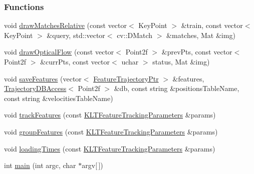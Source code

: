 \subsubsection*{Functions}
\begin{DoxyCompactItemize}
\item 
void \hyperlink{feature-based-tracking_8cpp_abdd9682450101445b0143ce9ebe15e69}{draw\-Matches\-Relative} (const vector$<$ Key\-Point $>$ \&train, const vector$<$ Key\-Point $>$ \&query, std\-::vector$<$ cv\-::\-D\-Match $>$ \&matches, Mat \&img)
\item 
void \hyperlink{feature-based-tracking_8cpp_aa072ce4b1977dc4227d2ab59cec93b5f}{draw\-Optical\-Flow} (const vector$<$ Point2f $>$ \&prev\-Pts, const vector$<$ Point2f $>$ \&curr\-Pts, const vector$<$ uchar $>$ status, Mat \&img)
\item 
void \hyperlink{feature-based-tracking_8cpp_a6812bb18e9569715c73f6ee0f25cad0a}{save\-Features} (vector$<$ \hyperlink{Motion_8hpp_a86ae4681c45e5385d5543cff332f56f4}{Feature\-Trajectory\-Ptr} $>$ \&features, \hyperlink{classTrajectoryDBAccess}{Trajectory\-D\-B\-Access}$<$ Point2f $>$ \&db, const string \&positions\-Table\-Name, const string \&velocities\-Table\-Name)
\item 
void \hyperlink{feature-based-tracking_8cpp_acaa5ac77506c5a9ca4454920c475cd1e}{track\-Features} (const \hyperlink{structKLTFeatureTrackingParameters}{K\-L\-T\-Feature\-Tracking\-Parameters} \&params)
\item 
void \hyperlink{feature-based-tracking_8cpp_abc4f24ddd212da941175e75958e5730e}{group\-Features} (const \hyperlink{structKLTFeatureTrackingParameters}{K\-L\-T\-Feature\-Tracking\-Parameters} \&params)
\item 
void \hyperlink{feature-based-tracking_8cpp_a30b9ea1acb0dbf815641bd3adcaabb77}{loading\-Times} (const \hyperlink{structKLTFeatureTrackingParameters}{K\-L\-T\-Feature\-Tracking\-Parameters} \&params)
\item 
int \hyperlink{feature-based-tracking_8cpp_a0ddf1224851353fc92bfbff6f499fa97}{main} (int argc, char $\ast$argv\mbox{[}$\,$\mbox{]})
\end{DoxyCompactItemize}


